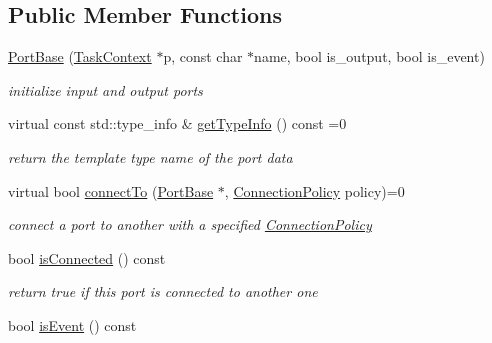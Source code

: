 \subsection*{Public Member Functions}
\begin{DoxyCompactItemize}
\item 
\hypertarget{classcoco_1_1_port_base_a2ea0fdbd5d33fec38c62211514b5d15d}{\hyperlink{classcoco_1_1_port_base_a2ea0fdbd5d33fec38c62211514b5d15d}{Port\-Base} (\hyperlink{classcoco_1_1_task_context}{Task\-Context} $\ast$p, const char $\ast$name, bool is\-\_\-output, bool is\-\_\-event)}\label{classcoco_1_1_port_base_a2ea0fdbd5d33fec38c62211514b5d15d}

\begin{DoxyCompactList}\small\item\em initialize input and output ports \end{DoxyCompactList}\item 
\hypertarget{classcoco_1_1_port_base_af8a455d7672cb6f13aa37cee2a9acc94}{virtual const std\-::type\-\_\-info \& \hyperlink{classcoco_1_1_port_base_af8a455d7672cb6f13aa37cee2a9acc94}{get\-Type\-Info} () const =0}\label{classcoco_1_1_port_base_af8a455d7672cb6f13aa37cee2a9acc94}

\begin{DoxyCompactList}\small\item\em return the template type name of the port data \end{DoxyCompactList}\item 
\hypertarget{classcoco_1_1_port_base_abc0fcdf9a73f1f8e66905feb2dc2b374}{virtual bool \hyperlink{classcoco_1_1_port_base_abc0fcdf9a73f1f8e66905feb2dc2b374}{connect\-To} (\hyperlink{classcoco_1_1_port_base}{Port\-Base} $\ast$, \hyperlink{structcoco_1_1_connection_policy}{Connection\-Policy} policy)=0}\label{classcoco_1_1_port_base_abc0fcdf9a73f1f8e66905feb2dc2b374}

\begin{DoxyCompactList}\small\item\em connect a port to another with a specified \hyperlink{structcoco_1_1_connection_policy}{Connection\-Policy} \end{DoxyCompactList}\item 
\hypertarget{classcoco_1_1_port_base_aca58d449d57e44cb7d47cdeb543e8b8f}{bool \hyperlink{classcoco_1_1_port_base_aca58d449d57e44cb7d47cdeb543e8b8f}{is\-Connected} () const }\label{classcoco_1_1_port_base_aca58d449d57e44cb7d47cdeb543e8b8f}

\begin{DoxyCompactList}\small\item\em return true if this port is connected to another one \end{DoxyCompactList}\item 
\hypertarget{classcoco_1_1_port_base_a161986c4e70cdbc6df2664aafb197e0c}{bool \hyperlink{classcoco_1_1_port_base_a161986c4e70cdbc6df2664aafb197e0c}{is\-Event} () const }\label{classcoco_1_1_port_base_a161986c4e70cdbc6df2664aafb197e0c}


\end{DoxyCompactItemize}

